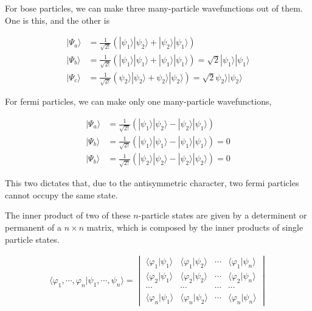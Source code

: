 ﻿\documentclass[twoside]{book}
\numberwithin{equation}{section}
\begin{document}
For bose particles, we can make three many-particle wavefunctions out of them. One is this, and the other is

\[\begin{split}
|\Psi_a\rangle &= \frac{1}{\sqrt{2!}}(|\psi_1\rangle|\psi_2\rangle + |\psi_2\rangle|\psi_1\rangle)\\
|\Psi_b\rangle &= \frac{1}{\sqrt{2!}}(|\psi_1\rangle|\psi_1\rangle + |\psi_1\rangle|\psi_1\rangle) = \sqrt{2}|\psi_1\rangle|\psi_1\rangle\\
|\Psi_c\rangle &= \frac{1}{\sqrt{2!}}(\psi_2\rangle|\psi_2\rangle + \psi_2\rangle|\psi_2\rangle) = \sqrt{2}\psi_2\rangle|\psi_2\rangle
\end{split} \]

For fermi particles, we can make only one many-particle wavefunctions, 

\[\begin{split}
|\Psi_a\rangle &= \frac{1}{\sqrt{2!}}(|\psi_1\rangle|\psi_2\rangle - |\psi_2\rangle|\psi_1\rangle) \\
|\Psi_b\rangle &= \frac{1}{\sqrt{2!}}(|\psi_1\rangle|\psi_1\rangle - |\psi_1\rangle|\psi_1\rangle) = 0 \\
|\Psi_b\rangle &= \frac{1}{\sqrt{2!}}(|\psi_2\rangle|\psi_2\rangle - |\psi_2\rangle|\psi_2\rangle) = 0 
\end{split}\] 

This two dictates that, due to the antisymmetric character, two fermi particles cannot occupy the same state. 

The inner product of two of these $n$-particle states are given by a determinent or permanent of a $n\times n$ matrix, which is composed by the inner products of single particle states. 

\begin{align}
\langle\varphi_1,\cdots,\varphi_n|\psi_1,\cdots,\psi_n\rangle = \begin{vmatrix}
\langle \varphi_1|\psi_1\rangle & \langle \varphi_1|\psi_2\rangle & \cdots & \langle \varphi_1|\psi_n\rangle\\
\langle \varphi_2|\psi_1\rangle & \langle \varphi_2|\psi_2\rangle & \cdots & \langle \varphi_2|\psi_n\rangle\\
\cdots & \cdots & \cdots & \cdots\\
\langle \varphi_n|\psi_1\rangle & \langle \varphi_n|\psi_2\rangle & \cdots & \langle \varphi_n|\psi_n\rangle
\end{vmatrix}
\end{align}
\end{document}

